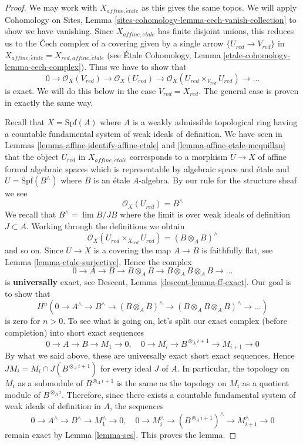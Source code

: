 \documentclass{stacks-project}
\theoremstyle{plain}
\theoremstyle{definition}
\theoremstyle{remark}
\numberwithin{equation}{subsection}
\def\lim{\mathop{\mathrm{lim}}\nolimits}
\def\etale{{\acute{e}tale}}
\begin{document}
\begin{proof}
We may work with $X_{affine, \etale}$ as this gives the same topos.
We will apply Cohomology on Sites, Lemma
\ref{sites-cohomology-lemma-cech-vanish-collection}
to show we have vanishing. Since $X_{affine, \etale}$
has finite disjoint unions, this reduces us to the {\v C}ech
complex of a covering given by a single arrow $\{U_{red} \to V_{red}\}$
in $X_{affine, \etale} = X_{red, affine, \etale}$
(see \'Etale Cohomology, Lemma \ref{etale-cohomology-lemma-cech-complex}).
Thus we have to show that
$$
0 \to \mathcal{O}_X(V_{red}) \to \mathcal{O}_X(U_{red}) \to
\mathcal{O}_X(U_{red} \times_{V_{red}} U_{red}) \to \ldots
$$
is exact. We will do this below in the case $V_{red} = X_{red}$.
The general case is proven in exactly the same way.

\medskip\noindent
Recall that $X = \text{Spf}(A)$ where $A$ is a
weakly admissible topological ring having a countable
fundamental system of weak ideals of definition.
We have seen in Lemmas
\ref{lemma-affine-identify-affine-etale} and
\ref{lemma-affine-etale-mcquillan}
that the object $U_{red}$ in $X_{affine, \etale}$
corresponds to a morphism $U \to X$ of affine formal
algebraic spaces which is representable by algebraic space and \'etale
and $U = \text{Spf}(B^\wedge)$ where $B$ is an \'etale $A$-algebra.
By our rule for the structure sheaf we see
$$
\mathcal{O}_X(U_{red}) = B^\wedge
$$
We recall that $B^\wedge = \lim B/JB$ where the limit is over weak
ideals of definition $J \subset A$.
Working through the definitions we obtain
$$
\mathcal{O}_X(U_{red} \times_{X_{red}} U_{red}) = (B \otimes_A B)^\wedge
$$
and so on. Since $U \to X$ is a covering the map $A \to B$
is faithfully flat, see Lemma \ref{lemma-etale-surjective}.
Hence the complex
$$
0 \to A \to B \to B \otimes_A B \to B \otimes_A B \otimes_A B \to \ldots
$$
is {\bf universally} exact, see Descent, Lemma \ref{descent-lemma-ff-exact}.
Our goal is to show that
$$
H^n(0 \to A^\wedge \to B^\wedge \to (B \otimes_A B)^\wedge
\to (B \otimes_A B \otimes_A B)^\wedge \to \ldots)
$$
is zero for $n > 0$. To see what is going on, let's split our
exact complex (before completion) into short exact sequences
$$
0 \to A \to B \to M_1 \to 0,\quad
0 \to M_i \to B^{\otimes_A i + 1} \to M_{i + 1} \to 0
$$
By what we said above, these are universally exact short exact
sequences. Hence $JM_i = M_i \cap J(B^{\otimes_A i + 1})$ for
every ideal $J$ of $A$. In particular, the
topology on $M_i$ as a submodule of $B^{\otimes_A i + 1}$
is the same as the topology on $M_i$ as a quotient module of
$B^{\otimes_A i}$. Therefore, since there exists a countable fundamental system
of weak ideals of definition in $A$, the sequences
$$
0 \to A^\wedge \to B^\wedge \to M_1^\wedge \to 0,\quad
0 \to M_i^\wedge \to (B^{\otimes_A i + 1})^\wedge \to M_{i + 1}^\wedge \to 0
$$
remain exact by Lemma \ref{lemma-ses}. This proves the lemma.
\end{proof}
\end{document}
